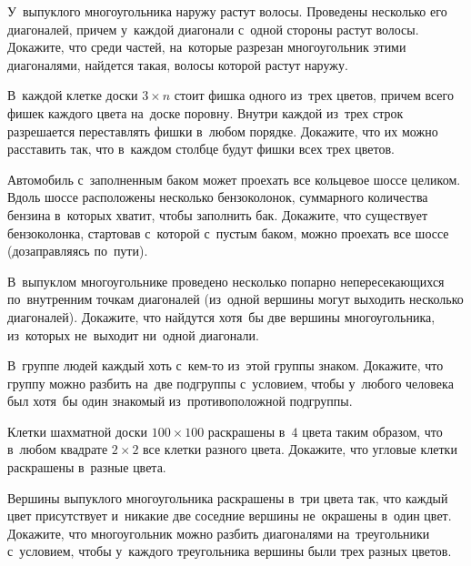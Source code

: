 


\begin{problems}

\item
У~выпуклого многоугольника наружу растут волосы.
Проведены несколько его диагоналей, причем у~каждой диагонали с~одной стороны
растут волосы.
Докажите, что среди частей, на~которые разрезан многоугольник этими
диагоналями, найдется такая, волосы которой растут наружу.

\item
В~каждой клетке доски $3 \times n$ стоит фишка одного из~трех цветов, причем
всего фишек каждого цвета на~доске поровну.
Внутри каждой из~трех строк разрешается переставлять фишки в~любом порядке.
Докажите, что их можно расставить так, что в~каждом столбце будут фишки всех
трех цветов.

\item
Автомобиль с~заполненным баком может проехать все кольцевое шоссе целиком.
Вдоль шоссе расположены несколько бензоколонок, суммарного количества бензина
в~которых хватит, чтобы заполнить бак.
Докажите, что существует бензоколонка, стартовав с~которой с~пустым баком,
можно проехать все шоссе (дозаправляясь по~пути).

\item
В~выпуклом многоугольнике проведено несколько попарно непересекающихся
по~внутренним точкам диагоналей
(из~одной вершины могут выходить несколько диагоналей).
Докажите, что найдутся хотя~бы две вершины многоугольника, из~которых
не~выходит ни~одной диагонали.

\item
В~группе людей каждый хоть с~кем-то из~этой группы знаком.
Докажите, что группу можно разбить на~две подгруппы с~условием, чтобы у~любого
человека был хотя~бы один знакомый из~противоположной подгруппы.

\item
Клетки шахматной доски $100 \times 100$ раскрашены в~$4$ цвета таким образом,
что в~любом квадрате $2 \times 2$ все клетки разного цвета.
Докажите, что угловые клетки раскрашены в~разные цвета.

\item
Вершины выпуклого многоугольника раскрашены в~три цвета так, что каждый цвет
присутствует и~никакие две соседние вершины не~окрашены в~один цвет.
Докажите, что многоугольник можно разбить диагоналями на~треугольники
с~условием, чтобы у~каждого треугольника вершины были трех разных цветов.


\end{problems}
